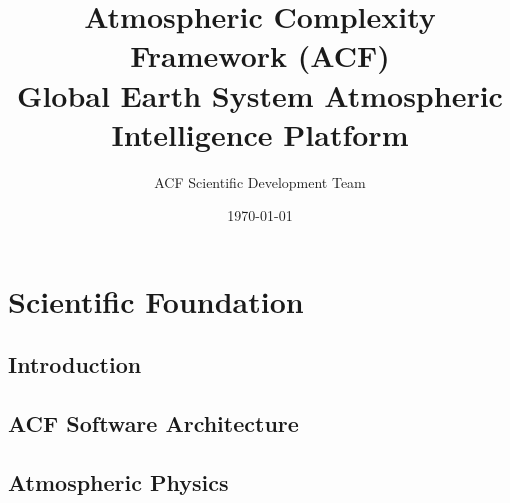 \documentclass[11pt,a4paper,oneside]{report}
\title{%
Atmospheric Complexity Framework (ACF)\\
Global Earth System Atmospheric Intelligence Platform
}
\author{%
ACF Scientific Development Team
}
\date{\today}
\begin{document}










\tableofcontents

\listoffigures

\listoftables









\part{Scientific Foundation}


\chapter{Introduction}




\chapter{ACF Software Architecture}




\chapter{Atmospheric Physics}





\end{document}
